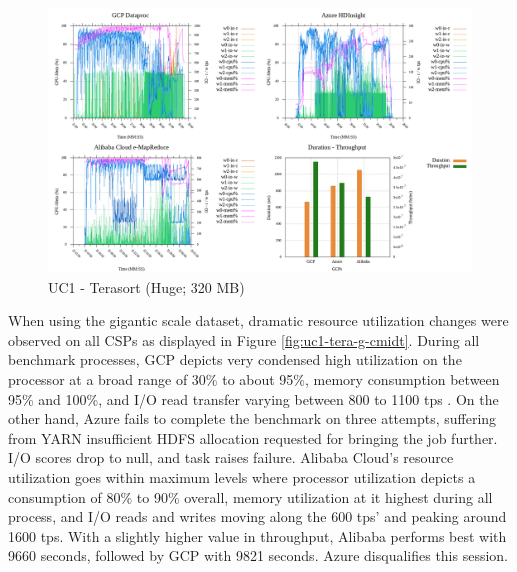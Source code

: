 \documentclass[review]{elsarticle}
\begin{document}
	\begin{figure}[p]
		\caption{UC1 - Terasort (Huge; 320 MB)}
		\label{fig:uc1-tera-h-cmidt}
		\includegraphics[width=\textwidth]{uc1-tera-h-cmidt}
		\centering
	\end{figure}
	
	When using the gigantic scale dataset, dramatic resource utilization changes were observed on all CSPs as displayed in Figure \ref{fig:uc1-tera-g-cmidt}. During all benchmark processes, GCP depicts very condensed high utilization on the processor at a broad range of 30\% to about 95\%, memory consumption between 95\% and 100\%, and I/O read transfer varying between 800 to 1100 tps . On the other hand, Azure fails to complete the benchmark on three attempts, suffering from YARN insufficient HDFS allocation requested for bringing the job further. I/O scores drop to null, and task raises failure. Alibaba Cloud's resource utilization goes within maximum levels where processor utilization depicts a consumption of 80\% to 90\% overall, memory utilization at it highest during all process, and I/O reads and writes moving along the 600 tps' and peaking around 1600 tps. With a slightly higher value in throughput, Alibaba performs best with 9660 seconds, followed by GCP with 9821 seconds. Azure disqualifies this session. 
	
\end{document}
